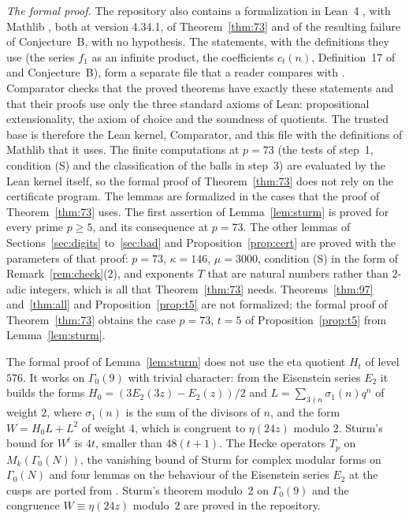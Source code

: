 \documentclass[12pt]{amsart}
\theoremstyle{definition}
\begin{document}
\emph{The formal proof.} The repository also contains a formalization in Lean~4 \cite{Lean}, with Mathlib \cite{Mathlib}, both at version 4.34.1, of Theorem~\ref{thm:73} and of the resulting failure of Conjecture~B, with no hypothesis. The statements, with the definitions they use (the series $f_1$ as an infinite product, the coefficients $c_t(n)$, Definition~17 of \cite{KZ3} and Conjecture~B), form a separate file that a reader compares with \cite{KZ3}. Comparator \cite{Comp} checks that the proved theorems have exactly these statements and that their proofs use only the three standard axioms of Lean: propositional extensionality, the axiom of choice and the soundness of quotients. The trusted base is therefore the Lean kernel, Comparator, and this file with the definitions of Mathlib that it uses. The finite computations at $p=73$ (the tests of step~1, condition (S) and the classification of the balls in step~3) are evaluated by the Lean kernel itself, so the formal proof of Theorem~\ref{thm:73} does not rely on the certificate program. The lemmas are formalized in the cases that the proof of Theorem~\ref{thm:73} uses. The first assertion of Lemma~\ref{lem:sturm} is proved for every prime $p\ge5$, and its consequence at $p=73$. The other lemmas of Sections~\ref{sec:digits} to~\ref{sec:bad} and Proposition~\ref{prop:cert} are proved with the parameters of that proof: $p=73$, $\kappa=146$, $\mu=3000$, condition (S) in the form of Remark~\ref{rem:check}(2), and exponents $T$ that are natural numbers rather than $2$-adic integers, which is all that Theorem~\ref{thm:73} needs. Theorems~\ref{thm:97} and~\ref{thm:all} and Proposition~\ref{prop:t5} are not formalized; the formal proof of Theorem~\ref{thm:73} obtains the case $p=73$, $t=5$ of Proposition~\ref{prop:t5} from Lemma~\ref{lem:sturm}.

The formal proof of Lemma~\ref{lem:sturm} does not use the eta quotient $H_t$ of level $576$. It works on $\Gamma_0(9)$ with trivial character: from the Eisenstein series $E_2$ it builds the forms $H_0=(3E_2(3z)-E_2(z))/2$ and $L=\sum_{3\nmid n}\sigma_1(n)q^n$ of weight $2$, where $\sigma_1(n)$ is the sum of the divisors of $n$, and the form $W=H_0L+L^2$ of weight $4$, which is congruent to $\eta(24z)$ modulo $2$. Sturm's bound for $W^t$ is $4t$, smaller than $48(t+1)$. The Hecke operators $T_p$ on $M_k(\Gamma_0(N))$, the vanishing bound of Sturm for complex modular forms on $\Gamma_0(N)$ and four lemmas on the behaviour of the Eisenstein series $E_2$ at the cusps are ported from \cite{FLT}. Sturm's theorem modulo~$2$ on $\Gamma_0(9)$ and the congruence $W\equiv\eta(24z)$ modulo~$2$ are proved in the repository.
\end{document}
